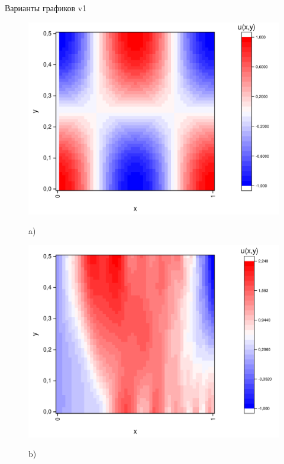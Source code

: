\documentclass[a4paper,12pt]{article}
\begin{document}
Варианты графиков v1
\begin{figure}[h!]
	\begin{center}
		\begin{minipage}[h]{0.23\linewidth}
			\includegraphics[width=\textwidth]{graphs/graphs_l/v1/wave_t-0_v1.pdf} \begin{center}	a)	\end{center}
		\end{minipage}
		\begin{minipage}[h]{0.23\linewidth}
			\includegraphics[width=\textwidth]{graphs/graphs_l/v1/wave_t-8_v1.pdf} \begin{center}	b)	\end{center}

\end{minipage}
\end{center}
\end{figure}
\end{document}
